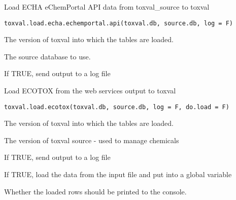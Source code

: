 \documentclass[letterpaper]{book}
\begin{document}
%
\begin{Description}\relax
Load ECHA eChemPortal API data from toxval\_source to toxval
\end{Description}
%
\begin{Usage}
\begin{verbatim}
toxval.load.echa.echemportal.api(toxval.db, source.db, log = F)
\end{verbatim}
\end{Usage}
%
\begin{Arguments}
\begin{ldescription}
\item[\code{toxval.db}] The version of toxval into which the tables are loaded.

\item[\code{source.db}] The source database to use.

\item[\code{log}] If TRUE, send output to a log file
\end{ldescription}
\end{Arguments}
%
\begin{Description}\relax
Load ECOTOX from the web services output to toxval
\end{Description}
%
\begin{Usage}
\begin{verbatim}
toxval.load.ecotox(toxval.db, source.db, log = F, do.load = F)
\end{verbatim}
\end{Usage}
%
\begin{Arguments}
\begin{ldescription}
\item[\code{toxval.db}] The version of toxval into which the tables are loaded.

\item[\code{source.db}] The version of toxval source - used to manage chemicals

\item[\code{log}] If TRUE, send output to a log file

\item[\code{do.load}] If TRUE, load the data from the input file and put into a global variable

\item[\code{verbose}] Whether the loaded rows should be printed to the console.
\end{ldescription}
\end{Arguments}
\end{document}
